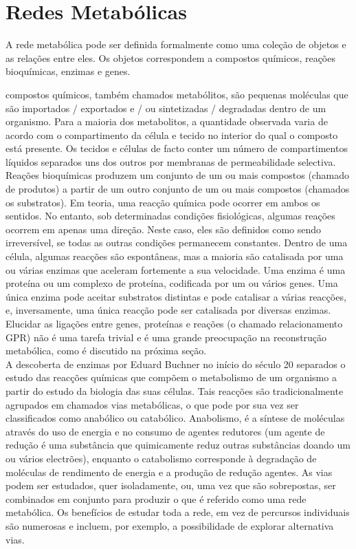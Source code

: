 \chapter{Redes Metabólicas}


\indent A rede metabólica pode ser definida formalmente como uma coleção de objetos e as relações entre eles. Os objetos correspondem a compostos químicos, reações bioquímicas, enzimas e genes.

\indent compostos químicos, também chamados metabólitos, são pequenas moléculas que são importados / exportados e / ou sintetizadas / degradadas dentro de um organismo. Para a maioria dos metabolitos, a quantidade observada varia de acordo com o compartimento da célula e tecido no interior do qual o composto está presente. Os tecidos e células de facto conter um número de compartimentos líquidos separados uns dos outros por membranas de permeabilidade selectiva. \\

\indent Reações bioquímicas produzem um conjunto de um ou mais compostos (chamado de produtos) a partir de um outro conjunto de um ou mais compostos (chamados os substratos). Em teoria, uma reacção química pode ocorrer em ambos os sentidos. No entanto, sob determinadas condições fisiológicas, algumas reações ocorrem em apenas uma direção. Neste caso, eles são definidos como sendo irreversível, se todas as outras condições permanecem constantes. Dentro de uma célula, algumas reacções são espontâneas, mas a maioria são catalisada por uma ou várias enzimas que aceleram fortemente a sua velocidade. Uma enzima é uma proteína ou um complexo de proteína, codificada por um ou vários genes. Uma única enzima pode aceitar substratos distintas e pode catalisar a várias reacções, e, inversamente, uma única reacção pode ser catalisada por diversas enzimas. Elucidar as ligações entre genes, proteínas e reações (o chamado relacionamento GPR) não é uma tarefa trivial e é uma grande preocupação na reconstrução metabólica, como é discutido na próxima seção. \\


\indent A descoberta de enzimas por Eduard Buchner no início do século 20 separados o estudo das reacções químicas que compõem o metabolismo de um organismo a partir do estudo da biologia das suas células. Tais reacções são tradicionalmente agrupados em chamados vias metabólicas, o que pode por sua vez ser classificados como anabólico ou catabólico. Anabolismo, é a síntese de moléculas através do uso de energia e no consumo de agentes redutores (um agente de redução é uma substância que quimicamente reduz outras substâncias doando um ou vários electrões), enquanto o catabolismo corresponde à degradação de moléculas de rendimento de energia e a produção de redução agentes. As vias podem ser estudados, quer isoladamente, ou, uma vez que são sobrepostas, ser combinados em conjunto para produzir o que é referido como uma rede metabólica. Os benefícios de estudar toda a rede, em vez de percursos individuais são numerosas e incluem, por exemplo, a possibilidade de explorar alternativa vias. \\


